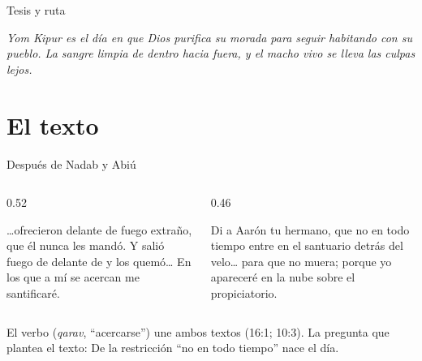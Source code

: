 \begin{frame}{Tesis y ruta}
\begin{tcolorbox}[colback=papiro,colframe=tierraroja,boxrule=1.2pt,arc=3pt]
\centering\small\itshape Yom Kipur es el día en que Dios purifica su morada para seguir habitando con su pueblo. La sangre limpia de dentro hacia fuera, y el macho vivo se lleva las culpas lejos.
\end{tcolorbox}
\centering
{}
\end{frame}

\section{El texto}

\begin{frame}{Después de Nadab y Abiú}
\begin{columns}[t,onlytextwidth]
\begin{column}{0.52\textwidth}
\begin{cita}\ldots{}ofrecieron delante de \SENOR{} fuego extraño, que él nunca les mandó. Y salió fuego de delante de \SENOR{} y los quemó\ldots{} En los que a mí se acercan me santificaré.\end{cita}
\end{column}
\begin{column}{0.46\textwidth}
\begin{cita}Di a Aarón tu hermano, que no en todo tiempo entre en el santuario detrás del velo\ldots{} para que no muera; porque yo apareceré en la nube sobre el propiciatorio.\end{cita}
\end{column}
\end{columns}
\small\RaggedRight El verbo  (\emph{qarav}, ``acercarse'') une ambos textos (16:1; 10:3). La pregunta que plantea el texto:  De la restricción ``no en todo tiempo'' nace el día.
\end{frame}

